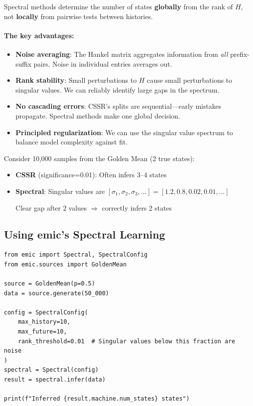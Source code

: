 \documentclass[11pt,a4paper]{article}
\theoremstyle{definition}
\theoremstyle{plain}
\begin{document}
\begin{keyidea}
Spectral methods determine the number of states \textbf{globally} from the rank of $H$, not \textbf{locally} from pairwise tests between histories.
\end{keyidea}

\paragraph{The key advantages:}
\begin{itemize}
    \item \textbf{Noise averaging}: The Hankel matrix aggregates information from \emph{all} prefix-suffix pairs. Noise in individual entries averages out.
    \item \textbf{Rank stability}: Small perturbations to $H$ cause small perturbations to singular values. We can reliably identify large gaps in the spectrum.
    \item \textbf{No cascading errors}: CSSR's splits are sequential---early mistakes propagate. Spectral methods make one global decision.
    \item \textbf{Principled regularization}: We can use the singular value spectrum to balance model complexity against fit.
\end{itemize}

\begin{example}[title=Spectral vs CSSR on Noisy Data]
Consider 10,000 samples from the Golden Mean (2 true states):
\begin{itemize}[nosep]
    \item \textbf{CSSR} (significance=0.01): Often infers 3--4 states
    \item \textbf{Spectral}: Singular values are $[\sigma_1, \sigma_2, \sigma_3, \ldots] = [1.2, 0.8, 0.02, 0.01, \ldots]$

    Clear gap after 2 values $\Rightarrow$ correctly infers 2 states
\end{itemize}
\end{example}

\subsection{Using emic's Spectral Learning}

\begin{lstlisting}
from emic import Spectral, SpectralConfig
from emic.sources import GoldenMean

source = GoldenMean(p=0.5)
data = source.generate(50_000)

config = SpectralConfig(
    max_history=10,
    max_future=10,
    rank_threshold=0.01  # Singular values below this fraction are noise
)
spectral = Spectral(config)
result = spectral.infer(data)

print(f"Inferred {result.machine.num_states} states")
\end{lstlisting}
\end{document}
